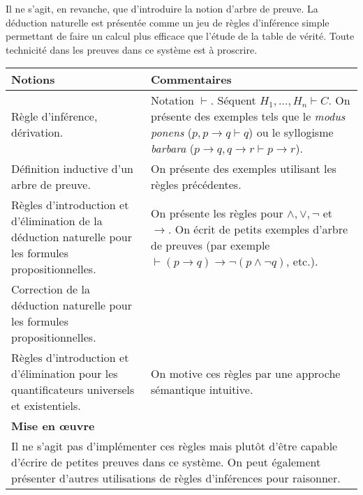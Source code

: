 Il ne s'agit, en revanche, que d'introduire la notion d'arbre de preuve. La
déduction naturelle est présentée comme un jeu de règles d'inférence simple
permettant de faire un calcul plus efficace que l'étude de la table de vérité. Toute technicité dans
les preuves dans ce système est à proscrire.

\noindent
\begin{longtable}{|p{\lnotion}|p{\comment}|}
    \hline
    \textbf{Notions} & \textbf{Commentaires} \\
    \hline \hline
    Règle d'inférence, dérivation. &
    Notation $\vdash$. Séquent $H_1,\dots,H_n
    \vdash C$. On présente des exemples tels que le \textit{modus ponens} ($p, p \rightarrow q \vdash q$) ou le syllogisme \textit{barbara} ($p \rightarrow q, q \rightarrow r \vdash p \rightarrow r$). 
\\
    Définition inductive d'un arbre de preuve. & On présente des exemples utilisant les règles précédentes. 
\\ 
    \hline
    Règles d'introduction et d'élimination de la déduction naturelle pour les
    formules propositionnelles. &
    On présente les règles pour $\wedge, \vee, \neg$ et
    $\rightarrow$. On écrit de petits exemples d'arbre de preuves (par exemple $\vdash (p \rightarrow q) \rightarrow \neg (p \wedge \neg q) $, etc.). \\
    Correction de la déduction naturelle pour les formules propositionnelles. & 
\\
    \hline
    Règles d'introduction et d'élimination pour les quantificateurs universels
    et existentiels.
    & On motive ces règles par une approche sémantique intuitive.
    \\
    \hline \hline 
    \multicolumn{2}{|p{\lmoe}|}{\textbf{Mise en \oe uvre}} \\
    \hline
    \multicolumn{2}{|p{\lmoe}|}{
        Il ne s'agit pas d'implémenter ces règles mais plutôt d'être
        capable d'écrire de petites preuves dans ce système. On peut également présenter
         d'autres utilisations de règles d'inférences pour raisonner.
    } \\
    \hline
\end{longtable}


